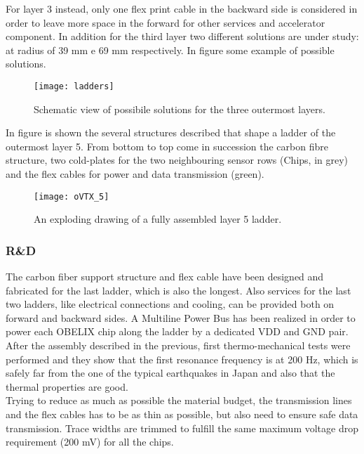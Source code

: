 For layer 3 instead, only one flex print cable in the backward side is considered in order to leave more space in the forward for other services and accelerator component. In addition for the third layer two different solutions are under study: at radius of 39 mm e 69 mm respectively. 
In figure  some example of possible solutions. 

\begin{figure}[h!]
\centering
\texttt{[image: ladders]}
\caption{Schematic view of possibile solutions for the three outermost layers.}
\label{fig:ladders}
\end{figure}


In figure  is shown the several structures described that shape a ladder of the outermost layer 5. From bottom to top come in succession the carbon fibre structure, two cold-plates for the two neighbouring sensor rows (Chips, in grey) and the flex cables for power and data transmission (green). 


\begin{figure}[h!]
\centering
\texttt{[image: oVTX\_5]}
\caption{An exploding drawing of a fully assembled layer 5 ladder.}
\label{fig:oVTX_5}
\end{figure}

\subsubsection{R\&D}

The carbon fiber support structure and flex cable have been designed and fabricated for the last ladder, which is also the longest. Also services for the last two ladders, like electrical connections and cooling, can be provided both on forward and backward sides.
A Multiline Power Bus has been realized in order to power each OBELIX chip along the ladder by a dedicated VDD and GND pair. \\

After the assembly described in the previous, first thermo-mechanical tests were performed and they show that the first resonance frequency is at 200 Hz, which is safely far from the one of the typical earthquakes in Japan and also that the thermal properties are good.\\

Trying to reduce as much as possible the material budget, the transmission lines and the flex cables has to be as thin as possible, but also need to ensure safe data transmission. Trace widths are trimmed to fulfill the same maximum voltage drop requirement (200 mV) for all the chips.

